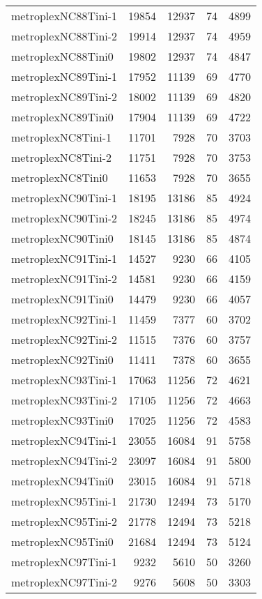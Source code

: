 \begin{longtable}{lrrrr}
metroplexNC88Tini-1 & 19854 & 12937 & 74 & 4899 \\
metroplexNC88Tini-2 & 19914 & 12937 & 74 & 4959 \\
metroplexNC88Tini0 & 19802 & 12937 & 74 & 4847 \\
metroplexNC89Tini-1 & 17952 & 11139 & 69 & 4770 \\
metroplexNC89Tini-2 & 18002 & 11139 & 69 & 4820 \\
metroplexNC89Tini0 & 17904 & 11139 & 69 & 4722 \\
metroplexNC8Tini-1 & 11701 & 7928 & 70 & 3703 \\
metroplexNC8Tini-2 & 11751 & 7928 & 70 & 3753 \\
metroplexNC8Tini0 & 11653 & 7928 & 70 & 3655 \\
metroplexNC90Tini-1 & 18195 & 13186 & 85 & 4924 \\
metroplexNC90Tini-2 & 18245 & 13186 & 85 & 4974 \\
metroplexNC90Tini0 & 18145 & 13186 & 85 & 4874 \\
metroplexNC91Tini-1 & 14527 & 9230 & 66 & 4105 \\
metroplexNC91Tini-2 & 14581 & 9230 & 66 & 4159 \\
metroplexNC91Tini0 & 14479 & 9230 & 66 & 4057 \\
metroplexNC92Tini-1 & 11459 & 7377 & 60 & 3702 \\
metroplexNC92Tini-2 & 11515 & 7376 & 60 & 3757 \\
metroplexNC92Tini0 & 11411 & 7378 & 60 & 3655 \\
metroplexNC93Tini-1 & 17063 & 11256 & 72 & 4621 \\
metroplexNC93Tini-2 & 17105 & 11256 & 72 & 4663 \\
metroplexNC93Tini0 & 17025 & 11256 & 72 & 4583 \\
metroplexNC94Tini-1 & 23055 & 16084 & 91 & 5758 \\
metroplexNC94Tini-2 & 23097 & 16084 & 91 & 5800 \\
metroplexNC94Tini0 & 23015 & 16084 & 91 & 5718 \\
metroplexNC95Tini-1 & 21730 & 12494 & 73 & 5170 \\
metroplexNC95Tini-2 & 21778 & 12494 & 73 & 5218 \\
metroplexNC95Tini0 & 21684 & 12494 & 73 & 5124 \\
metroplexNC97Tini-1 & 9232 & 5610 & 50 & 3260 \\
metroplexNC97Tini-2 & 9276 & 5608 & 50 & 3303 \\

\end{longtable}
